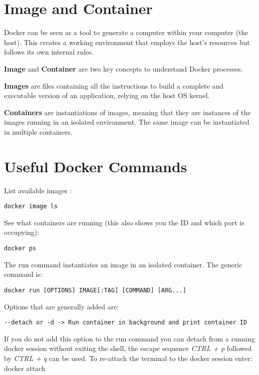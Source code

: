 \documentclass[
]{book}
\begin{document}
\hypertarget{image-and-container}{%
\section{Image and Container}\label{image-and-container}}

Docker can be seen as a tool to generate a computer within your computer (the host). This creates a working environment that employs the host's resources but follows its own internal rules.

\textbf{Image} and \textbf{Container} are two key concepts to understand Docker processes.

\textbf{Images} are files containing all the instructions to build a complete and executable version of an application, relying on the host OS kernel.

\textbf{Containers} are instantiations of images, meaning that they are instances of the images running in an isolated environment. The same image can be instantiated in multiple containers.

\hypertarget{useful-docker-commands}{%
\section{Useful Docker Commands}\label{useful-docker-commands}}

List available images :

\begin{verbatim}
docker image ls
\end{verbatim}

See what containers are running (this also shows you the ID and which port is occupying):

\begin{verbatim}
docker ps
\end{verbatim}

The run command instantiates an image in an isolated container. The generic command is:

\begin{verbatim}
docker run [OPTIONS] IMAGE[:TAG] [COMMAND] [ARG...]
\end{verbatim}

Options that are generally added are:

\begin{verbatim}
--detach or -d -> Run container in background and print container ID
\end{verbatim}

If you do not add this option to the run command you can detach from a running docker session without exiting the shell, the escape sequence \emph{CTRL + p} followed by \emph{CTRL + q} can be used. To re-attach the terminal to the docker session enter: docker attach
\end{document}
